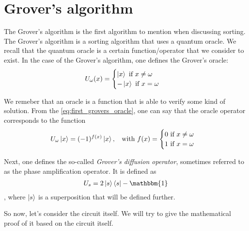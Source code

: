 \section*{Grover's algorithm}
The Grover's algorithm is the first algorithm to mention when discussing sorting. 
The Grover's algorithm is a sorting algorithm that uses a quantum oracle.
We recall that the quantum oracle is a certain function/operator that we consider 
to exist.
In the case of the Grover's algorithm, one defines the Grover's oracle:
\begin{equation}
  U_\omega (x) = 
  \begin{cases}
    \ket{x} \text{ if } x \neq \omega\\
    -\ket{x} \text{ if } x = \omega
  \end{cases}
  \label{eq:first_grovers_oracle}
\end{equation}

We remeber that an oracle is a function that is able to verify some kind of solution.
From the \autoref{eq:first_grovers_oracle}, one can say that the oracle operator corresponds 
to the function
\begin{equation}
  U_\omega\ket{x} = (-1)^{f(x)}\ket{x}, \;\; \text{ with } 
  f(x) = \begin{cases}
    0 \text{ if } x \neq \omega \\
    1 \text{ if } x = \omega
  \end{cases}
  \label{eq:grovers_algorithm}
\end{equation}

Next, one defines the so-called \textsl{Grover's diffusion operator}, sometimes referred to as the 
phase amplification operator. It is defined as 
\begin{gather}
  U_s = 2\ket{s}\bra{s} - \mathbbm{1}
  \label{eq:grovers_diffusion}
\end{gather}
, where $\ket{s}$ is a superposition that will be defined further.

So now, let's consider the circuit itself. We will try to give the mathematical proof of it based on the circuit itself.

